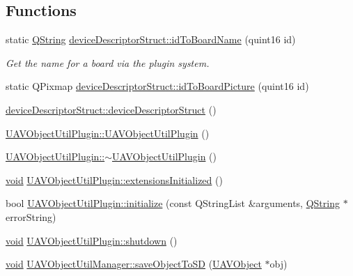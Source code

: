 \subsection*{\-Functions}
\begin{DoxyCompactItemize}
\item 
static \hyperlink{group___u_a_v_objects_plugin_gab9d252f49c333c94a72f97ce3105a32d}{\-Q\-String} \hyperlink{group___u_a_v_object_util_plugin_ga7e79b308b3743586bbaed68286e694e6}{device\-Descriptor\-Struct\-::id\-To\-Board\-Name} (quint16 id)
\begin{DoxyCompactList}\small\item\em \-Get the name for a board via the plugin system. \end{DoxyCompactList}\item 
static \-Q\-Pixmap \hyperlink{group___u_a_v_object_util_plugin_ga445e8ccb97ef5d05ed372fbd13532042}{device\-Descriptor\-Struct\-::id\-To\-Board\-Picture} (quint16 id)
\item 
\hyperlink{group___u_a_v_object_util_plugin_ga09cd541275c17c51873b51573cacbb5d}{device\-Descriptor\-Struct\-::device\-Descriptor\-Struct} ()
\item 
\hyperlink{group___u_a_v_object_util_plugin_ga3b705535aeae994a52c3d401767492c8}{\-U\-A\-V\-Object\-Util\-Plugin\-::\-U\-A\-V\-Object\-Util\-Plugin} ()
\item 
\hyperlink{group___u_a_v_object_util_plugin_ga1818db06a0b7162d9b933a9418dee8d6}{\-U\-A\-V\-Object\-Util\-Plugin\-::$\sim$\-U\-A\-V\-Object\-Util\-Plugin} ()
\item 
\hyperlink{group___u_a_v_objects_plugin_ga444cf2ff3f0ecbe028adce838d373f5c}{void} \hyperlink{group___u_a_v_object_util_plugin_ga644ec0f06cf775004f4f5cd28a60080a}{\-U\-A\-V\-Object\-Util\-Plugin\-::extensions\-Initialized} ()
\item 
bool \hyperlink{group___u_a_v_object_util_plugin_ga21707781be0dfd017ec41e59ef8bf7af}{\-U\-A\-V\-Object\-Util\-Plugin\-::initialize} (const \-Q\-String\-List \&arguments, \hyperlink{group___u_a_v_objects_plugin_gab9d252f49c333c94a72f97ce3105a32d}{\-Q\-String} $\ast$error\-String)
\item 
\hyperlink{group___u_a_v_objects_plugin_ga444cf2ff3f0ecbe028adce838d373f5c}{void} \hyperlink{group___u_a_v_object_util_plugin_ga14d874a44f94ae805fa0d683410ccfcb}{\-U\-A\-V\-Object\-Util\-Plugin\-::shutdown} ()
\item 
\hyperlink{group___u_a_v_objects_plugin_ga444cf2ff3f0ecbe028adce838d373f5c}{void} \hyperlink{group___u_a_v_object_util_plugin_ga007cecfcbf4a9d18c1f2c9ec13de4222}{\-U\-A\-V\-Object\-Util\-Manager\-::save\-Object\-To\-S\-D} (\hyperlink{class_u_a_v_object}{\-U\-A\-V\-Object} $\ast$obj)

\end{DoxyCompactItemize}

